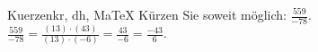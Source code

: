 \begin{MAufgabe}{Kuerzen}{kr, dh, MaTeX}
K\"urzen Sie soweit m\"oglich: $\frac{559}{-78}$.\\ 
\ifLsg\MLoesung
\quad $\frac{559}{-78}=\frac{(13)\cdot(43)}{(13)\cdot(-6)}=\frac{43}{-6}=\frac{-43}{6}$.\else\relax\fi
 \end{MAufgabe}
